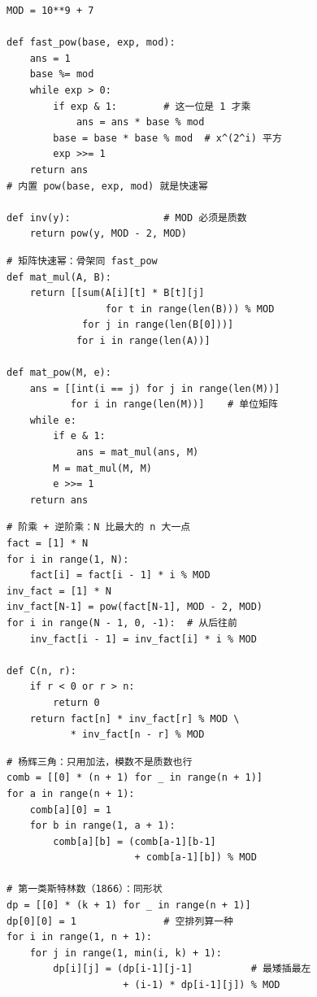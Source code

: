 \noindent\begin{minipage}[t]{0.49\linewidth}
\begin{lstlisting}
MOD = 10**9 + 7

def fast_pow(base, exp, mod):
    ans = 1
    base %= mod
    while exp > 0:
        if exp & 1:        # 这一位是 1 才乘
            ans = ans * base % mod
        base = base * base % mod  # x^(2^i) 平方
        exp >>= 1
    return ans
# 内置 pow(base, exp, mod) 就是快速幂

def inv(y):                # MOD 必须是质数
    return pow(y, MOD - 2, MOD)
\end{lstlisting}
\end{minipage}\hfill
\begin{minipage}[t]{0.49\linewidth}
\begin{lstlisting}
# 矩阵快速幂：骨架同 fast_pow
def mat_mul(A, B):
    return [[sum(A[i][t] * B[t][j]
                 for t in range(len(B))) % MOD
             for j in range(len(B[0]))]
            for i in range(len(A))]

def mat_pow(M, e):
    ans = [[int(i == j) for j in range(len(M))]
           for i in range(len(M))]    # 单位矩阵
    while e:
        if e & 1:
            ans = mat_mul(ans, M)
        M = mat_mul(M, M)
        e >>= 1
    return ans
\end{lstlisting}
\end{minipage}

\noindent\begin{minipage}[t]{0.49\linewidth}
\begin{lstlisting}
# 阶乘 + 逆阶乘：N 比最大的 n 大一点
fact = [1] * N
for i in range(1, N):
    fact[i] = fact[i - 1] * i % MOD
inv_fact = [1] * N
inv_fact[N-1] = pow(fact[N-1], MOD - 2, MOD)
for i in range(N - 1, 0, -1):  # 从后往前
    inv_fact[i - 1] = inv_fact[i] * i % MOD

def C(n, r):
    if r < 0 or r > n:
        return 0
    return fact[n] * inv_fact[r] % MOD \
           * inv_fact[n - r] % MOD
\end{lstlisting}
\end{minipage}\hfill
\begin{minipage}[t]{0.49\linewidth}
\begin{lstlisting}
# 杨辉三角：只用加法，模数不是质数也行
comb = [[0] * (n + 1) for _ in range(n + 1)]
for a in range(n + 1):
    comb[a][0] = 1
    for b in range(1, a + 1):
        comb[a][b] = (comb[a-1][b-1]
                      + comb[a-1][b]) % MOD

# 第一类斯特林数（1866）：同形状
dp = [[0] * (k + 1) for _ in range(n + 1)]
dp[0][0] = 1               # 空排列算一种
for i in range(1, n + 1):
    for j in range(1, min(i, k) + 1):
        dp[i][j] = (dp[i-1][j-1]          # 最矮插最左
                    + (i-1) * dp[i-1][j]) % MOD
\end{lstlisting}
\end{minipage}

